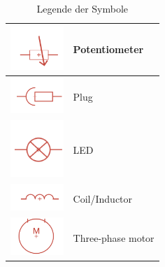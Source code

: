\begin{table}[ht]
{\begin{tabular}{|m{5cm}|m{7cm}|}
			\hline
			\centering\includegraphics[width=2cm]{Legende/Potentiometer.png} & \centering Potentiometer \tabularnewline
			\hline
			\centering\includegraphics[width=2cm]{Legende/Stecker.png} & \centering Plug \tabularnewline
			\hline
			\centering\includegraphics[width=2cm]{Legende/LED.png} & \centering LED \tabularnewline
			\hline
			\centering\includegraphics[width=2cm]{Legende/Spule.png} & \centering Coil/Inductor \tabularnewline
			\hline
			\centering\includegraphics[width=2cm]{Legende/3 Phasen Motor.png} & \centering Three-phase motor \tabularnewline
			\hline
	\end{tabular}}
	\caption{Legende der Symbole}
	\label{tab:legende}
\end{table}